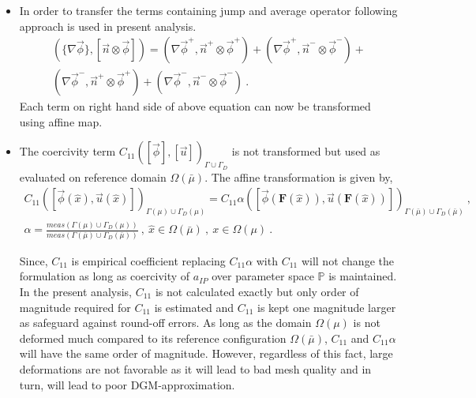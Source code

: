 \documentclass[graybox]{svmult}
\begin{document}
\begin{itemize}
\item In order to transfer the terms containing jump and average operator following approach is used in present analysis.
\begin{equation*}\label{jump_average_term_split}
\begin{split}
\left(\lbrace \nabla \overrightarrow{\phi} \rbrace , \left[ \overrightarrow{n} \otimes \overrightarrow{\phi}  \right]  \right) = \left( \nabla \overrightarrow{\phi}^+ , \overrightarrow{n}^+ \otimes \overrightarrow{\phi}^+ \right) + \left( \nabla \overrightarrow{\phi}^+ , \overrightarrow{n}^- \otimes \overrightarrow{\phi}^- \right) + \\ 
\left( \nabla \overrightarrow{\phi}^- , \overrightarrow{n}^+ \otimes \overrightarrow{\phi}^+ \right) + \left( \nabla \overrightarrow{\phi}^- , \overrightarrow{n}^- \otimes \overrightarrow{\phi}^- \right) \ .
\end{split}
\end{equation*}
Each term on right hand side of above equation can now be transformed using affine map.

\item The coercivity term $C_{11}\left( [\overrightarrow{\phi}],[\overrightarrow{u}] \right)_{\Gamma \cup \Gamma_D}$ is not transformed but used as evaluated on reference domain $\Omega(\bar{\mu})$. The affine transformation is given by,
\begin{equation*}
\begin{split}
C_{11}\left( [\overrightarrow{\phi}(\hat{x}),\overrightarrow{u}(\hat{x})] \right)_{\Gamma(\mu) \cup \Gamma_D(\mu)} = C_{11} \alpha \left( [\overrightarrow{\phi}(\bm{F}(\hat{x})),\overrightarrow{u}(\bm{F}(\hat{x}))] \right)_{\Gamma(\bar{\mu}) \cup \Gamma_D(\bar{\mu})} \ , \\
\alpha = \frac{meas\left( \Gamma(\mu) \cup \Gamma_D(\mu)\right)}{meas\left( \Gamma(\bar{\mu}) \cup \Gamma_D(\bar{\mu})\right)} \ , \ \hat{x} \in \Omega(\bar{\mu}) \ , \ x \in \Omega(\mu) \ .
\end{split}
\end{equation*}

Since, $C_{11}$ is empirical coefficient replacing $C_{11} \alpha$ with $C_{11}$ will not change the formulation as long as coercivity of $a_{IP}$ over parameter space $\mathbb{P}$ is maintained. In the present analysis, $C_{11}$ is not calculated exactly but only order of magnitude required for $C_{11}$ is estimated and $C_{11}$ is kept one magnitude larger as safeguard against round-off errors. As long as the domain $\Omega(\mu)$ is not deformed much compared to its reference configuration $\Omega(\bar{\mu})$, $C_{11}$ and $C_{11}\alpha$ will have the same order of magnitude. However, regardless of this fact, large deformations are not favorable as it will lead to bad mesh quality and in turn, will lead to poor DGM-approximation.
\end{itemize}
\end{document}
